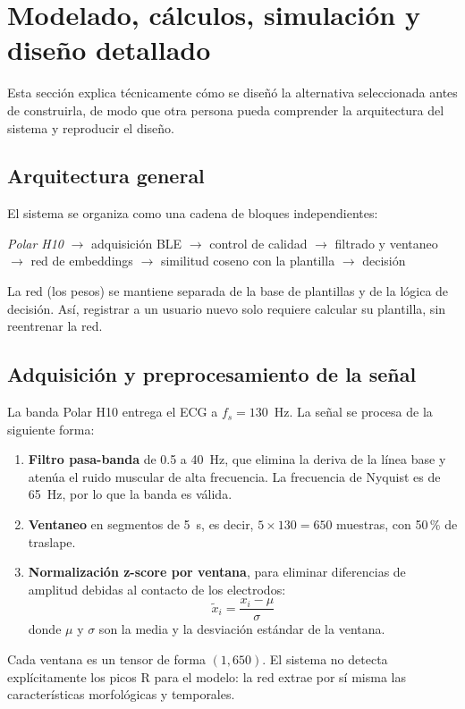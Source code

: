 \section{Modelado, cálculos, simulación y diseño detallado}
\label{sec:diseno}

Esta sección explica técnicamente cómo se diseñó la alternativa seleccionada antes de construirla, de modo que otra persona pueda comprender la arquitectura del sistema y reproducir el diseño.

\subsection{Arquitectura general}

El sistema se organiza como una cadena de bloques independientes:
\begin{center}
\emph{Polar H10} $\rightarrow$ adquisición BLE $\rightarrow$ control de calidad $\rightarrow$ filtrado y ventaneo $\rightarrow$ red de embeddings $\rightarrow$ similitud coseno con la plantilla $\rightarrow$ decisión
\end{center}

La red (los pesos) se mantiene separada de la base de plantillas y de la lógica de decisión. Así, registrar a un usuario nuevo solo requiere calcular su plantilla, sin reentrenar la red.

\subsection{Adquisición y preprocesamiento de la señal}

La banda Polar H10 entrega el ECG a $f_s = 130$~Hz. La señal se procesa de la siguiente forma:
\begin{enumerate}
  \item \textbf{Filtro pasa-banda} de 0.5 a 40~Hz, que elimina la deriva de la línea base y atenúa el ruido muscular de alta frecuencia. La frecuencia de Nyquist es de 65~Hz, por lo que la banda es válida.
  \item \textbf{Ventaneo} en segmentos de 5~s, es decir, $5 \times 130 = 650$ muestras, con 50\,\% de traslape.
  \item \textbf{Normalización z-score por ventana}, para eliminar diferencias de amplitud debidas al contacto de los electrodos:
  \begin{equation}
    \tilde{x}_i = \frac{x_i - \mu}{\sigma}
  \end{equation}
  donde $\mu$ y $\sigma$ son la media y la desviación estándar de la ventana.
\end{enumerate}
Cada ventana es un tensor de forma $(1, 650)$. El sistema no detecta explícitamente los picos R para el modelo: la red extrae por sí misma las características morfológicas y temporales.

